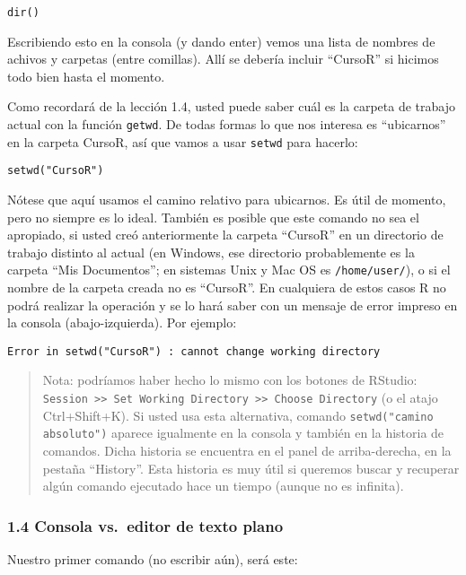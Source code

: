 \documentclass[]{article}
\begin{document}
\begin{verbatim}
dir()
\end{verbatim}
Escribiendo esto en la consola (y dando enter) vemos una lista de
nombres de achivos y carpetas (entre comillas). Allí se debería incluir
``CursoR'' si hicimos todo bien hasta el momento.

Como recordará de la lección 1.4, usted puede saber cuál es la carpeta
de trabajo actual con la función \texttt{getwd}. De todas formas lo que
nos interesa es ``ubicarnos'' en la carpeta CursoR, así que vamos a usar
\texttt{setwd} para hacerlo:

\begin{verbatim}
setwd("CursoR")
\end{verbatim}
Nótese que aquí usamos el camino relativo para ubicarnos. Es útil de
momento, pero no siempre es lo ideal. También es posible que este
comando no sea el apropiado, si usted creó anteriormente la carpeta
``CursoR'' en un directorio de trabajo distinto al actual (en Windows,
ese directorio probablemente es la carpeta ``Mis Documentos''; en
sistemas Unix y Mac OS es \texttt{/home/user/}), o si el nombre de la
carpeta creada no es ``CursoR''. En cualquiera de estos casos R no podrá
realizar la operación y se lo hará saber con un mensaje de error impreso
en la consola (abajo-izquierda). Por ejemplo:

\begin{verbatim}
Error in setwd("CursoR") : cannot change working directory
\end{verbatim}
\begin{quote}
Nota: podríamos haber hecho lo mismo con los botones de RStudio:
\texttt{Session \textgreater{}\textgreater{} Set Working Directory \textgreater{}\textgreater{} Choose Directory}
(o el atajo Ctrl+Shift+K). Si usted usa esta alternativa, comando
\texttt{setwd("camino absoluto")} aparece igualmente en la consola y
también en la historia de comandos. Dicha historia se encuentra en el
panel de arriba-derecha, en la pestaña ``History''. Esta historia es muy
útil si queremos buscar y recuperar algún comando ejecutado hace un
tiempo (aunque no es infinita).

\end{quote}
\subsubsection{1.4 Consola vs.~editor de texto plano}

Nuestro primer comando (no escribir aún), será este:
\end{document}
